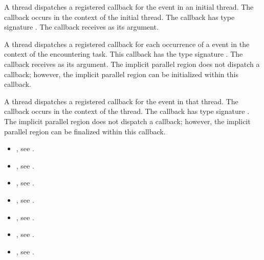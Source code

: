 \tools

A thread dispatches a registered 
callback for the  event in an initial thread.
The callback occurs in the context of the initial thread.
The callback has type signature .
The callback receives  as its  argument.

A thread dispatches a registered 
callback for each occurrence of a  event
in the context of the encountering task.  This callback has the type signature
.
The callback receives  as its  argument.
The implicit parallel region does not dispatch a  callback;
however, the implicit parallel region can be initialized within this 
callback.

A thread dispatches a registered 
callback for the  event in that thread.
The callback occurs in the context of the thread.  The callback has type signature
.
The implicit parallel region does not dispatch a  callback;
however, the implicit parallel region can be finalized within this 
callback.

\crossreferences
\begin{itemize}

\item {},            see .
\item {},              see .
\item {},   see .
\item {},     see .
\item {}, see .
\item {},   see .
\item {},    see .


\end{itemize}

